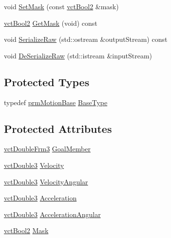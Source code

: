 \begin{DoxyCompactItemize}
void \hyperlink{classprm_position_cartesian_set_ac124e153f424a8bc82ade814174e1bd7}{Set\-Mask} (const \hyperlink{vct_fixed_size_vector_types_8h_ab49415a9643a1ee037f2a036058caeaa}{vct\-Bool2} \&mask)
\item 
\hyperlink{vct_fixed_size_vector_types_8h_ab49415a9643a1ee037f2a036058caeaa}{vct\-Bool2} \hyperlink{classprm_position_cartesian_set_a6387dc6119064e7a2e1bcb782de73e20}{Get\-Mask} (void) const 
\item 
void \hyperlink{classprm_position_cartesian_set_a3c1923c0aa5324783b2a81088cb7698d}{Serialize\-Raw} (std\-::ostream \&output\-Stream) const 
\item 
void \hyperlink{classprm_position_cartesian_set_ab2717495d22e9071d8606b14c5d71c9b}{De\-Serialize\-Raw} (std\-::istream \&input\-Stream)
\end{DoxyCompactItemize}
\subsection*{Protected Types}
\begin{DoxyCompactItemize}
\item 
typedef \hyperlink{classprm_motion_base}{prm\-Motion\-Base} \hyperlink{classprm_position_cartesian_set_ad8d7923e983724ee18081a6fcf1ebce8}{Base\-Type}
\end{DoxyCompactItemize}
\subsection*{Protected Attributes}
\begin{DoxyCompactItemize}
\item 
\hyperlink{vct_transformation_types_8h_acc33ebdc1b58783aa59508c7b5200b56}{vct\-Double\-Frm3} \hyperlink{classprm_position_cartesian_set_afa8b6da3bc44612f35332ad2c8d09bc1}{Goal\-Member}
\item 
\hyperlink{vct_fixed_size_vector_types_8h_a4a89122c9d7f72c3f31fe8126e17c3af}{vct\-Double3} \hyperlink{classprm_position_cartesian_set_a218381fcba3a988483998be35d62e855}{Velocity}
\item 
\hyperlink{vct_fixed_size_vector_types_8h_a4a89122c9d7f72c3f31fe8126e17c3af}{vct\-Double3} \hyperlink{classprm_position_cartesian_set_a3dc6dc353b6f68440b1784352aba06d9}{Velocity\-Angular}
\item 
\hyperlink{vct_fixed_size_vector_types_8h_a4a89122c9d7f72c3f31fe8126e17c3af}{vct\-Double3} \hyperlink{classprm_position_cartesian_set_a6144a72c9905a29333b7943fabd93150}{Acceleration}
\item 
\hyperlink{vct_fixed_size_vector_types_8h_a4a89122c9d7f72c3f31fe8126e17c3af}{vct\-Double3} \hyperlink{classprm_position_cartesian_set_a0c8c1b02ab4feb3961921d7ce49f1657}{Acceleration\-Angular}
\item 
\hyperlink{vct_fixed_size_vector_types_8h_ab49415a9643a1ee037f2a036058caeaa}{vct\-Bool2} \hyperlink{classprm_position_cartesian_set_aa9dcc7db15cd8fc1417d0db5ddc0aec7}{Mask}
\end{DoxyCompactItemize}

